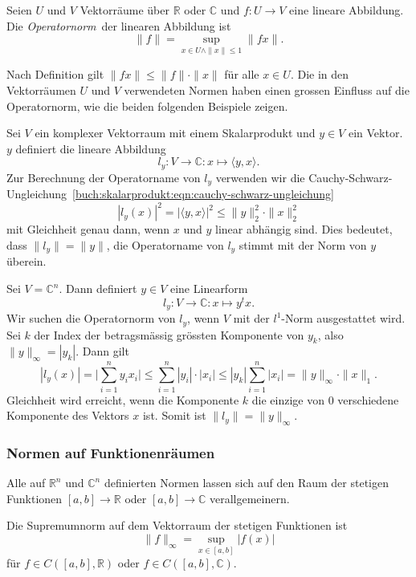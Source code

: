 \begin{definition}
\label{buch:vektoren-matrizen:def:operatornorm}
Seien $U$ und $V$ Vektorräume über $\mathbb{R}$ oder $\mathbb{C}$ und
$f\colon U\to V$ eine lineare Abbildung.
Die {\em Operatornorm} der linearen Abbildung ist 
%
\[
\|f\|
=
\sup_{x\in U\wedge \|x\|\le 1} \|fx\|.
\]
\end{definition}

Nach Definition gilt $\|fx\| \le \|f\|\cdot \|x\|$ für alle $x\in U$.
Die in den Vektorräumen $U$ und $V$ verwendeten Normen haben einen
grossen Einfluss auf die Operatornorm, wie die beiden folgenden
Beispiele zeigen.

\begin{beispiel}
Sei $V$ ein komplexer Vektorraum mit einem Skalarprodukt und $y\in V$ ein
Vektor.
$y$ definiert die lineare Abbildung
\[
l_y
\colon
V\to \mathbb{C}: x\mapsto \langle y,x\rangle.
\]
Zur Berechnung der Operatorname von $l_y$ verwenden wir die
Cauchy-Schwarz-Ungleichung~\eqref{buch:skalarprodukt:eqn:cauchy-schwarz-ungleichung}
\[
|l_y(x)|^2
=
|\langle y,x\rangle|^2
\le
\|y\|_2^2\cdot \|x\|_2^2
\]
mit Gleichheit genau dann, wenn $x$ und $y$ linear abhängig sind.
Dies bedeutet, dass
$\|l_y\|=\|y\|$, die Operatorname von $l_y$ stimmt mit der Norm von $y$
überein.
\end{beispiel}

\begin{beispiel}
Sei $V=\mathbb{C}^n$. 
Dann definiert $y\in V$ eine Linearform
\[
l_y
\colon
V\to \mathbb C
:
x\mapsto y^tx.
\]
Wir suchen  die Operatornorm von $l_y$, wenn $V$ mit der $l^1$-Norm
ausgestattet wird.
Sei $k$ der Index der betragsmässig grössten Komponente von $y_k$,
also $\| y\|_\infty = |y_k|$.
Dann gilt
\[
|l_y(x)|
=
\biggl|\sum_{i=1}^n y_ix_i\biggr|
\le
\sum_{i=1}^n |y_i|\cdot |x_i|
\le
|y_k| \sum_{i=1}^n |x_i|
=
\|y\|_\infty\cdot \|x\|_1.
\]
Gleichheit wird erreicht, wenn die Komponente $k$ die einzige
von $0$ verschiedene Komponente des Vektors $x$ ist.
Somit ist $\|l_y\| = \|y\|_\infty$.
\end{beispiel}


\subsubsection{Normen auf Funktionenräumen}
Alle auf $\mathbb{R}^n$ und $\mathbb{C}^n$ definierten Normen lassen
sich auf den Raum der stetigen Funktionen $[a,b]\to\mathbb{R}$ oder
$[a,b]\to\mathbb{C}$ verallgemeinern.

Die Supremumnorm auf dem Vektorraum der stetigen Funktionen ist
%
\[
\|f\|_\infty = \sup_{x\in[a,b]} |f(x)|
\]
für $f\in C([a,b],\mathbb{R})$ oder $f\in C([a,b],\mathbb{C})$.

